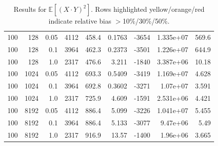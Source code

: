 \documentclass{article}
\begin{document}
\begin{table}[htbp]
\begin{tabular}{rrr|rrrrrr}
\midrule
\rowcolor{red!40}100 & 128 & 0.05 & 4112 & 458.4 & 0.1763 & -3654 & 1.335e+07 & 569.6 \\
\rowcolor{red!40}100 & 128 & 0.1 & 3964 & 462.3 & 0.2373 & -3501 & 1.226e+07 & 644.9 \\
\rowcolor{red!40}100 & 128 & 1.0 & 2317 & 476.6 & 3.211 & -1840 & 3.387e+06 & 10.18 \\
\midrule
\rowcolor{red!40}100 & 1024 & 0.05 & 4112 & 693.3 & 0.5409 & -3419 & 1.169e+07 & 4.628 \\
\rowcolor{red!40}100 & 1024 & 0.1 & 3964 & 692.8 & 0.3602 & -3271 & 1.07e+07 & 3.591 \\
\rowcolor{red!40}100 & 1024 & 1.0 & 2317 & 725.9 & 4.609 & -1591 & 2.531e+06 & 4.421 \\
\midrule
\rowcolor{red!40}100 & 8192 & 0.05 & 4112 & 886.4 & 5.099 & -3226 & 1.041e+07 & 5.455 \\
\rowcolor{red!40}100 & 8192 & 0.1 & 3964 & 886.4 & 5.133 & -3077 & 9.47e+06 & 5.49 \\
\rowcolor{red!40}100 & 8192 & 1.0 & 2317 & 916.9 & 13.57 & -1400 & 1.96e+06 & 3.665 \\
\bottomrule
\end{tabular}
\caption{Results for $\mathbb{E}[(X \cdot Y)^2]$. Rows highlighted yellow/orange/red indicate relative bias $>$10\%/30\%/50\%.}
\label{tab:EZ2}
\end{table}
\end{document}
